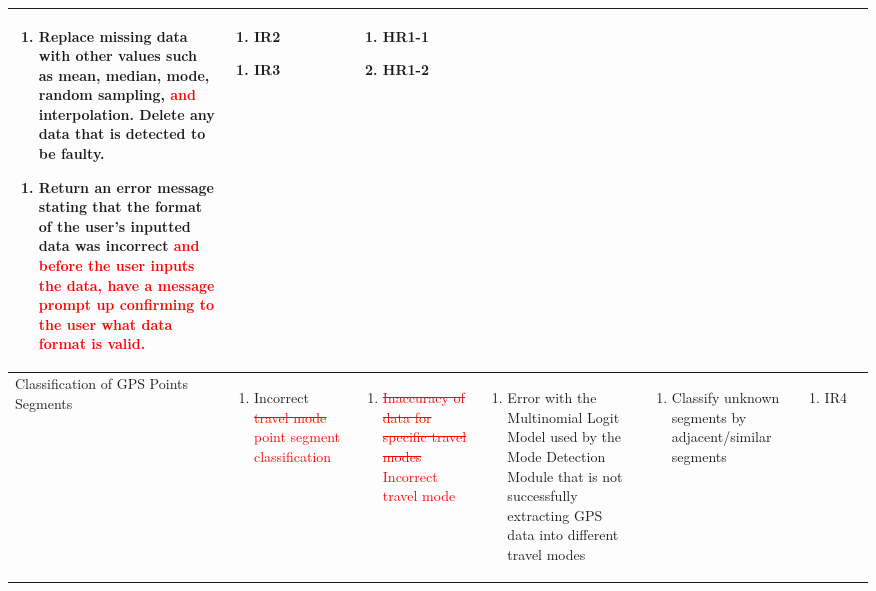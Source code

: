 \documentclass{article}
\begin{document}
\begin{landscape}
\begin{longtable}{|p{2.5cm}|p{3.5cm}|p{3.5cm}|p{3.5cm}|p{5.5cm}|p{1.8cm}|p{2cm}|}
\begin{enumerate}[label=1\alph*.]
     \item Replace missing data with other values such as mean, median, mode, random sampling, \textcolor{red}{and} interpolation. Delete any data that is detected to be faulty.
 \end{enumerate}
   \begin{enumerate}[label=2\alph*.]
     \item Return an error message stating that the format of the user's inputted data was incorrect \textcolor{red}{and before the user inputs the data, have a message prompt up confirming to the user what data format is valid.} 
 \end{enumerate}
&  
\begin{enumerate}[label=1\alph*.]
     \item IR2
 \end{enumerate}
 \begin{enumerate}[label=2\alph*.]
     \item IR3
 \end{enumerate}
&
\begin{enumerate}
     \item HR1-1
     \item HR1-2
 \end{enumerate}
 \\
 \hline
 Classification of GPS Points Segments
 &
  \begin{enumerate}
     \item Incorrect \textcolor{red}{\sout{travel mode} point segment classification}
 \end{enumerate}
 & 
  \begin{enumerate}
     \item \textcolor{red}{\sout{Inaccuracy of data for specific travel modes} Incorrect travel mode}
 \end{enumerate}
 &
 \begin{enumerate}[label=1\alph*.]
     \item Error with the Multinomial Logit Model used by the Mode Detection Module that is not successfully extracting GPS data into different travel modes
 \end{enumerate}
 &
  \begin{enumerate}[label=1\alph*.]
     \item Classify unknown segments by adjacent/similar segments
 \end{enumerate}
  & \begin{enumerate}[label=1\alph*.]
     \item IR4
 \end{enumerate}

\end{longtable}
\end{landscape}
\end{document}
